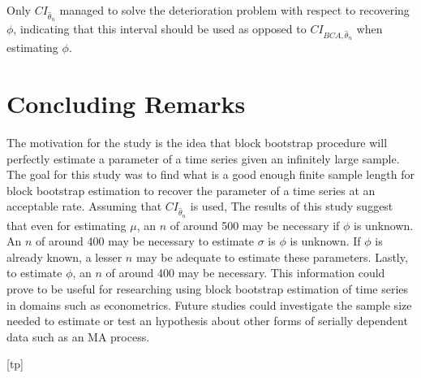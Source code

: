 \documentclass[12pt, letterpaper, titlepage]{article}
\begin{document}
Only $CI_{\hat{\theta}_{n}}$ managed to solve the deterioration problem with respect to recovering $\phi$, indicating that this interval should be used as opposed to $CI_{BCA, \hat{\theta}_{n}}$ when estimating $\phi$.

\section{Concluding Remarks}
\label{sec:conremarks}

The motivation for the study is the idea that block bootstrap procedure will perfectly estimate a parameter of a time series given an infinitely large sample. The goal for this study was to find what is a good enough finite sample length for block bootstrap estimation to recover the parameter of a time series at an acceptable rate. Assuming that $CI_{\hat{\theta}_{n}}$ is used, The results of this study suggest that even for estimating $\mu$, an $n$ of around 500 may be necessary if $\phi$ is unknown. An $n$ of around 400 may be necessary to estimate $\sigma$ is $\phi$ is unknown. If $\phi$ is already known, a lesser $n$ may be adequate to estimate these parameters. Lastly, to estimate $\phi$, an $n$ of around 400 may be necessary. This information could prove to be useful for researching using block bootstrap estimation of time series in domains such as econometrics. Future studies could investigate the sample size needed to estimate or test an hypothesis about other forms of serially dependent data such as an MA process.



[tp]
\end{document}
